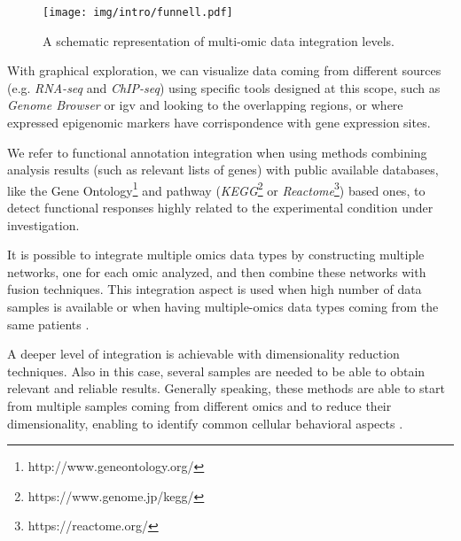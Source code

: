 \begin{figure}[h]
\centering
\texttt{[image: img/intro/funnell.pdf]}
\caption[Integration Funnell]{A schematic representation of multi-omic data integration levels.}
\label{fig:funnell}
\end{figure}

With graphical exploration, we can visualize data coming from different sources (e.g. \textit{RNA-seq} and \textit{ChIP-seq}) using specific tools designed at this scope, such as \textit{Genome Browser} \cite{Karolchik2011} or \gls{igv} \cite{Robinson2011, Thorvaldsdottir2013} and looking to the overlapping regions, or where expressed epigenomic markers have corrispondence with gene expression sites.

We refer to functional annotation integration when using methods combining analysis results (such as relevant lists of genes) with public available databases,  like the Gene Ontology\footnote{http://www.geneontology.org/} and pathway (\textit{KEGG}\footnote{https://www.genome.jp/kegg/} or \textit{Reactome}\footnote{https://reactome.org/}) based ones, to detect functional responses highly related to the experimental condition under investigation.

It is possible to integrate multiple omics data types by constructing multiple networks, one for each omic analyzed, and then combine these networks with fusion techniques.
This integration aspect is used when high number of data samples is available or when having multiple-omics data types coming from the same patients \cite{Wang2014}.

A deeper level of integration is achievable with dimensionality reduction techniques. 
Also in this case, several samples are needed to be able to obtain relevant and reliable results.
Generally speaking, these methods are able to start from multiple samples coming from different omics and to reduce their dimensionality, enabling to identify common cellular behavioral aspects \cite{Rohart2017,Argelaguet2018}.



